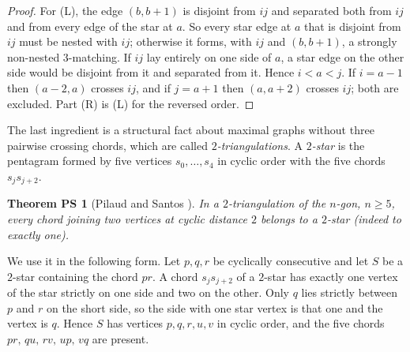 \documentclass[11pt]{amsart}
\newtheorem*{ps}{Theorem PS}
\theoremstyle{definition}\newtheorem{problem}{Problem}
\theoremstyle{remark}\newtheorem*{remark}{Remark}
\begin{document}
\begin{proof}
For (L), the edge $(b,b+1)$ is disjoint from $ij$ and separated both from $ij$ and from every edge of the star at
$a$. So every star edge at $a$ that is disjoint from $ij$ must be nested with $ij$; otherwise it forms, with $ij$ and
$(b,b+1)$, a strongly non-nested $3$-matching. If $ij$ lay entirely on one side of $a$, a star edge on the other side
would be disjoint from it and separated from it. Hence $i<a<j$. If $i=a-1$ then $(a-2,a)$ crosses $ij$, and if $j=a+1$
then $(a,a+2)$ crosses $ij$; both are excluded. Part (R) is (L) for the reversed order.
\end{proof}

The last ingredient is a structural fact about maximal graphs without three pairwise crossing chords, which are
called \emph{$2$-triangulations}. A \emph{$2$-star} is the pentagram formed by five vertices $s_0,\dots,s_4$ in
cyclic order with the five chords $s_js_{j+2}$.

\begin{ps}[Pilaud and Santos {\cite[Corollary~4.2(ii)]{PS}}]
In a $2$-triangulation of the $n$-gon, $n\ge5$, every chord joining two vertices at cyclic distance $2$ belongs to a
$2$-star \textup{(}indeed to exactly one\textup{)}.
\end{ps}

We use it in the following form. Let $p,q,r$ be cyclically consecutive and let $S$ be a $2$-star containing the chord
$pr$. A chord $s_js_{j+2}$ of a $2$-star has exactly one vertex of the star strictly on one side and two on the other.
Only $q$ lies strictly between $p$ and $r$ on the short side, so the side with one star vertex is that one and the
vertex is $q$. Hence $S$ has vertices $p,q,r,u,v$ in cyclic order, and the five chords $pr,\,qu,\,rv,\,up,\,vq$
are present.
\end{document}
